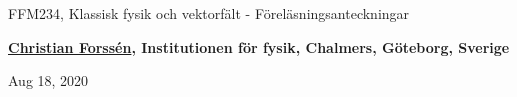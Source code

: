 \documentclass[%
oneside,                 %
final,                   %
10pt]{article}
\begin{document}

\newcommand{\exercisesection}[1]{\subsection*{#1}}







\thispagestyle{empty}

\begin{center}
{\LARGE\bf
\begin{spacing}{1.25}
FFM234, Klassisk fysik och vektorfält - Föreläsningsanteckningar
\end{spacing}
}
\end{center}


\begin{center}
{\bf \href{{http://fy.chalmers.se/subatom/tsp/}}{Christian Forssén}, Institutionen för fysik, Chalmers, Göteborg, Sverige${}^{}$} \\ [0mm]
\end{center}

\begin{center}
\end{center}
    

\begin{center}
Aug 18, 2020
\end{center}

\vspace{1cm}
\end{document}
